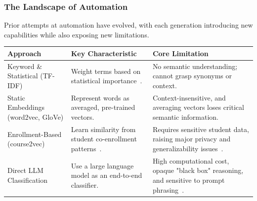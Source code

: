 \documentclass[aspectratio=169,10pt]{beamer}
\begin{document}
\begin{frame}
    \frametitle{The Landscape of Automation}
    
    Prior attempts at automation have evolved, with each generation introducing new capabilities while also exposing new limitations.
    
    \vspace{1em}

    \footnotesize
    \renewcommand{\arraystretch}{1.5} %
    \begin{tabularx}{\textwidth}{>{\raggedright\arraybackslash}p{2.7cm} >{\raggedright\arraybackslash}X >{\raggedright\arraybackslash}X}
    \toprule
    \textbf{Approach} & \textbf{Key Characteristic} & \textbf{Core Limitation} \\
    \midrule
    
    Keyword \& Statistical (TF-IDF)
    & Weight terms based on statistical importance~\cite{AIZAWA200345}.
    & No semantic understanding; cannot grasp synonyms or context. \\
    
    \addlinespace %
    
    Static Embeddings (word2vec, GloVe)
    & Represent words as averaged, pre-trained vectors.
    & Context-insensitive, and averaging vectors loses critical semantic information. \\
    
    \addlinespace
    
    Enrollment-Based (course2vec)
    & Learn similarity from student co-enrollment patterns~\cite{PardosCourse2Vec2019}.
    & Requires sensitive student data, raising major privacy and generalizability issues~\cite{slade10.1177/0002764213479366}. \\
    
    \addlinespace
    
    Direct LLM Classification
    & Use a large language model as an end-to-end classifier.
    & High computational cost, opaque "black box" reasoning, and sensitive to prompt phrasing~\cite{Errica2024WhatDI}. \\
    
    \bottomrule
    \end{tabularx}
    

\end{frame}
\end{document}
